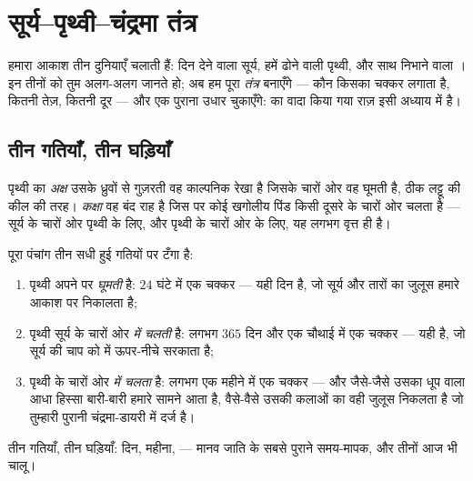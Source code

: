 \chapter{सूर्य--पृथ्वी--चंद्रमा तंत्र}\label{ch:g6:sun-earth-moon}

हमारा आकाश तीन दुनियाएँ चलाती हैं: दिन देने वाला सूर्य, हमें ढोने वाली
पृथ्वी, और साथ निभाने वाला । इन तीनों को तुम अलग-अलग जानते हो;
अब हम पूरा \emph{तंत्र} बनाएँगे --- कौन किसका चक्कर लगाता है, कितनी
तेज़, कितनी दूर --- और एक पुराना उधार चुकाएँगे:  का वादा किया गया
राज़ इसी अध्याय में है।

\section{तीन गतियाँ, तीन घड़ियाँ}

\begin{definition}[अक्ष और कक्षा]\label{def:g6:sun-earth-moon:axisorbit}
पृथ्वी का \emph{अक्ष} उसके ध्रुवों से गुज़रती वह काल्पनिक
रेखा है जिसके चारों ओर वह घूमती है, ठीक लट्टू की कील की तरह।
\emph{कक्षा} वह बंद राह है जिस पर कोई खगोलीय पिंड किसी
दूसरे के चारों ओर चलता है --- सूर्य के चारों ओर पृथ्वी के लिए, और
पृथ्वी के चारों ओर  के लिए, यह लगभग वृत्त ही है।
\end{definition}

\begin{proposition}[तीन गतियाँ]\label{prop:g6:sun-earth-moon:motions}
पूरा पंचांग तीन सधी हुई गतियों पर टँगा है:
\begin{enumerate}
  \item पृथ्वी अपने  पर \emph{घूमती} है: $24$ घंटे में एक चक्कर
        --- यही दिन है, जो सूर्य और तारों का जुलूस हमारे आकाश पर
        निकालता है;
  \item पृथ्वी सूर्य के चारों ओर \emph{ में चलती} है: लगभग
        $365$ दिन और एक चौथाई में एक चक्कर --- यही  है, जो
        सूर्य की चाप को  में ऊपर-नीचे सरकाता है;
  \item {} पृथ्वी के चारों ओर \emph{ में चलता} है: लगभग
        एक महीने में एक चक्कर --- और जैसे-जैसे उसका धूप वाला आधा
        हिस्सा बारी-बारी हमारे सामने आता है, वैसे-वैसे उसकी कलाओं का
        वही जुलूस निकलता है जो तुम्हारी पुरानी चंद्रमा-डायरी में दर्ज
        है।
\end{enumerate}
तीन गतियाँ, तीन घड़ियाँ: दिन, महीना,  --- मानव जाति के सबसे पुराने
समय-मापक, और तीनों आज भी चालू।
\end{proposition}

